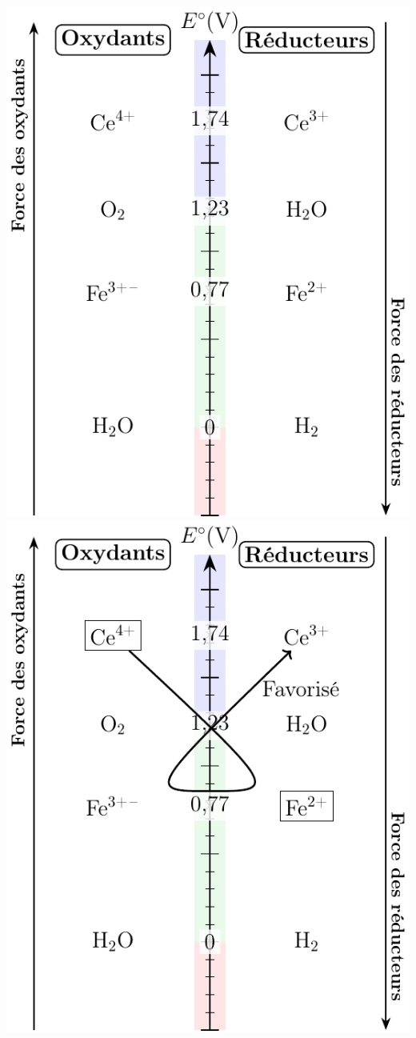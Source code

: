 \documentclass[../../main/main.tex]{subfiles}
\begin{document}
\begin{tcb*}[sidebyside, righthand ratio=.25]
\begin{center}
{			\includegraphics[width=\linewidth]{estand_fece-plain}
		}{
			\includegraphics[width=\linewidth]{estand_fece}
}
\end{center}
\end{tcb*}
\end{document}
